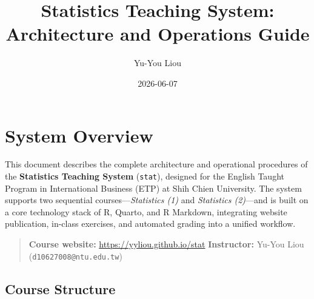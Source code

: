 \documentclass[
]{article}
\title{\textbf{Statistics Teaching System: Architecture and Operations
Guide}}
\author{Yu-You Liou}
\date{2026-06-07}
\begin{document}
\maketitle

{
\setcounter{tocdepth}{3}
\tableofcontents
}
\newpage

\section{System Overview}\label{system-overview}

This document describes the complete architecture and operational
procedures of the \textbf{Statistics Teaching System} (\texttt{stat}),
designed for the English Taught Program in International Business (ETP)
at Shih Chien University. The system supports two sequential
courses---\emph{Statistics (1)} and \emph{Statistics (2)}---and is built
on a core technology stack of R, Quarto, and R Markdown, integrating
website publication, in-class exercises, and automated grading into a
unified workflow.

\begin{quote}
\textbf{Course website:} \url{https://yyliou.github.io/stat}
\textbf{Instructor:} Yu-You Liou (\texttt{d10627008@ntu.edu.tw})
\end{quote}

\subsection{Course Structure}\label{course-structure}
\end{document}
